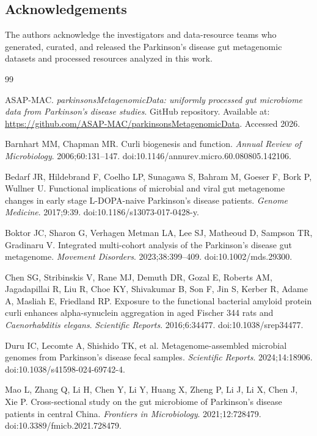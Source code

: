\documentclass[11pt]{article}
\begin{document}
\subsection*{Acknowledgements}
The authors acknowledge the investigators and data-resource teams who generated, curated, and released the Parkinson's disease gut metagenomic datasets and processed resources analyzed in this work.

\begin{thebibliography}{99}

ASAP-MAC. \textit{parkinsonsMetagenomicData: uniformly processed gut microbiome data from Parkinson's disease studies}. GitHub repository. Available at: \url{https://github.com/ASAP-MAC/parkinsonsMetagenomicData}. Accessed 2026.

Barnhart MM, Chapman MR. Curli biogenesis and function. \textit{Annual Review of Microbiology}. 2006;60:131--147. doi:10.1146/annurev.micro.60.080805.142106.

Bedarf JR, Hildebrand F, Coelho LP, Sunagawa S, Bahram M, Goeser F, Bork P, Wullner U. Functional implications of microbial and viral gut metagenome changes in early stage L-DOPA-naive Parkinson's disease patients. \textit{Genome Medicine}. 2017;9:39. doi:10.1186/s13073-017-0428-y.

Boktor JC, Sharon G, Verhagen Metman LA, Lee SJ, Matheoud D, Sampson TR, Gradinaru V. Integrated multi-cohort analysis of the Parkinson's disease gut metagenome. \textit{Movement Disorders}. 2023;38:399--409. doi:10.1002/mds.29300.

Chen SG, Stribinskis V, Rane MJ, Demuth DR, Gozal E, Roberts AM, Jagadapillai R, Liu R, Choe KY, Shivakumar B, Son F, Jin S, Kerber R, Adame A, Masliah E, Friedland RP. Exposure to the functional bacterial amyloid protein curli enhances alpha-synuclein aggregation in aged Fischer 344 rats and \textit{Caenorhabditis elegans}. \textit{Scientific Reports}. 2016;6:34477. doi:10.1038/srep34477.

Duru IC, Lecomte A, Shishido TK, et al. Metagenome-assembled microbial genomes from Parkinson's disease fecal samples. \textit{Scientific Reports}. 2024;14:18906. doi:10.1038/s41598-024-69742-4.

Mao L, Zhang Q, Li H, Chen Y, Li Y, Huang X, Zheng P, Li J, Li X, Chen J, Xie P. Cross-sectional study on the gut microbiome of Parkinson's disease patients in central China. \textit{Frontiers in Microbiology}. 2021;12:728479. doi:10.3389/fmicb.2021.728479.


\end{thebibliography}
\end{document}
